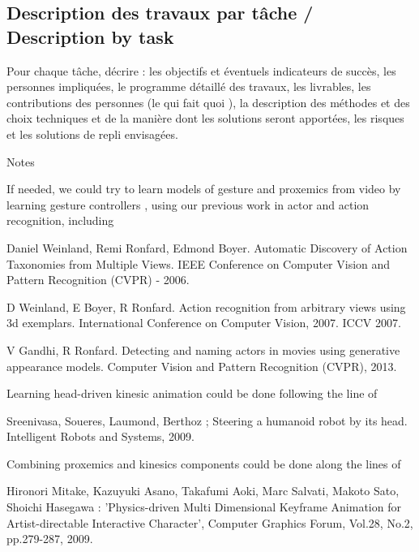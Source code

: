 
\subsection{Description des travaux par tâche / Description by task}
\begin{xcomment}  
Pour chaque tâche, d\'ecrire : 
les objectifs et \'eventuels indicateurs de succ\`es,
les personnes impliqu\'ees,
le programme d\'etaill\'e des travaux,
les livrables,
les contributions des personnes (le qui fait quoi ),
la description des m\'ethodes et des choix techniques et de la mani\`ere dont les solutions seront apport\'ees,
les risques et les solutions de repli envisag\'ees.
\end{xcomment}















Notes


If needed, we could try to learn models of gesture and proxemics from video by learning gesture controllers \cite{Levine2010},
using  our previous work in actor and action recognition, including

Daniel Weinland, Remi Ronfard, Edmond Boyer. Automatic Discovery of Action Taxonomies from Multiple Views. IEEE Conference on Computer Vision and Pattern Recognition (CVPR) - 2006. 

D Weinland, E Boyer, R Ronfard. Action recognition from arbitrary views using 3d exemplars. International Conference on Computer Vision, 2007. ICCV 2007.

V Gandhi, R Ronfard.   Detecting and naming actors in movies using generative appearance models. Computer Vision and Pattern Recognition (CVPR), 2013.


Learning head-driven kinesic animation could be done following the line of 

Sreenivasa, Soueres, Laumond, Berthoz ; Steering a humanoid robot by its head. Intelligent Robots and Systems, 2009.

Combining proxemics and kinesics components could be done along the lines of

Hironori Mitake, Kazuyuki Asano, Takafumi Aoki, Marc Salvati, Makoto Sato, Shoichi Hasegawa : 'Physics-driven Multi Dimensional Keyframe Animation for Artist-directable Interactive Character', Computer Graphics Forum, Vol.28, No.2, pp.279-287, 2009.





